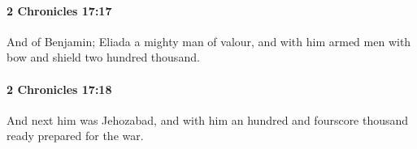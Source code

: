 		\paragraph{2 Chronicles 17:17} %
			\label{2CHRONICLES-17-17}

			And of Benjamin; Eliada a mighty man of valour, and with him armed men with bow and shield two hundred thousand.


		\paragraph{2 Chronicles 17:18} %
			\label{2CHRONICLES-17-18}

			And next him was Jehozabad, and with him an hundred and fourscore thousand ready prepared for the war.


